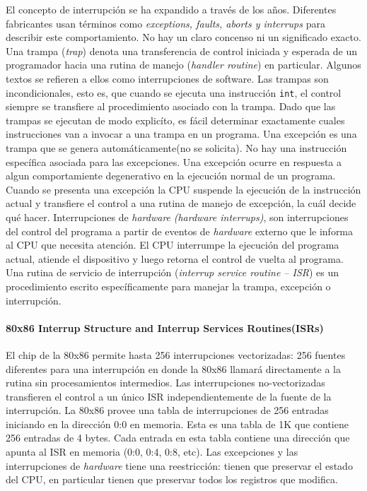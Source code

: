 El concepto de interrupción se ha expandido a través de los años. Diferentes fabricantes usan términos como \textit{exceptions, faults, aborts \textnormal{y} interrups} para describir este comportamiento. No hay un claro concenso ni un significado exacto.
Una trampa (\textit{trap}) denota una transferencia de control iniciada y esperada de un programador hacia una rutina de manejo (\textit{handler routine}) en particular. Algunos textos se refieren a ellos como interrupciones de software. Las trampas son incondicionales, esto es, que cuando se ejecuta una instrucción \texttt{int}, el control siempre se transfiere al procedimiento asociado con la trampa. Dado que las trampas se ejecutan de modo explicíto, es fácil determinar exactamente cuales instrucciones van a invocar a una trampa en un programa. Una excepción es una trampa que se genera automáticamente(no se solicita). No hay una instrucción específica asociada para las excepciones. Una excepción ocurre en respuesta a algun comportamiente degenerativo en la ejecución normal de un programa. Cuando se presenta una excepción la CPU suspende la ejecución de la instrucción actual y transfiere el control a una rutina de manejo de excepción, la cuál decide qué hacer. Interrupciones de \textit{hardware} \textit{(hardware interrups)}, son interrupciones del control del programa a partir de eventos de \textit{hardware} externo que le informa al CPU que necesita atención. El CPU interrumpe la ejecución del programa actual, atiende el dispositivo y luego retorna el control de vuelta al programa. Una rutina de servicio de interrupción (\textit{interrup service routine -- ISR}) es un procedimiento escrito específicamente para manejar la trampa, excepción o interrupción.

\paragraph{\textnormal{\textbf{80x86 Interrup Structure and Interrup Services Routines(ISRs)}}}
El chip de la 80x86 permite hasta 256 interrupciones vectorizadas: 256 fuentes diferentes para una interrupción en donde la 80x86 llamará directamente a la rutina sin procesamientos intermedios. Las interrupciones no-vectorizadas transfieren el control a un único ISR independientemente de la fuente de la interrupción. La 80x86 provee una tabla de interrupciones de 256 entradas iniciando en la dirección 0:0 en memoria. Esta es una tabla de 1K que contiene 256 entradas de 4 bytes. Cada entrada en esta tabla contiene una dirección que apunta al ISR en memoria (0:0, 0:4, 0:8, etc). Las excepciones y las interrupciones de \textit{hardware} tiene una reestricción: tienen que preservar el estado del CPU, en particular tienen que preservar todos los registros que modifica.

